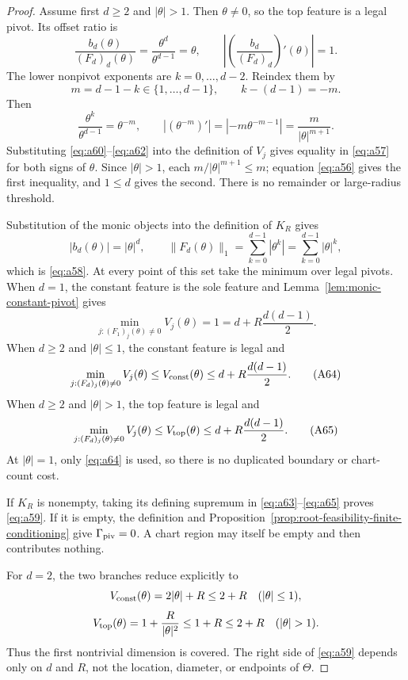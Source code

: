 \begin{proof}
Assume first $d\geq2$ and $|\theta|>1$.  Then $\theta\neq0$, so the top
feature is a legal pivot.  Its offset ratio is
\[
\frac{b_d(\theta)}{(F_d)_d(\theta)}
=\frac{\theta^d}{\theta^{d-1}}=\theta,
\qquad
\left|\left(\frac{b_d}{(F_d)_d}\right)'(\theta)\right|=1.
\tag{A60}\label{eq:a60}
\]
The lower nonpivot exponents are $k=0,\ldots,d-2$.  Reindex them by
\[
m=d-1-k\in\{1,\ldots,d-1\},
\qquad k-(d-1)=-m.
\tag{A61}\label{eq:a61}
\]
Then
\[
\frac{\theta^k}{\theta^{d-1}}=\theta^{-m},
\qquad
| (\theta^{-m})' |
=|-m\theta^{-m-1}|
=\frac{m}{|\theta|^{m+1}}.
\tag{A62}\label{eq:a62}
\]
Substituting \eqref{eq:a60}--\eqref{eq:a62} into the definition of $V_j$
gives equality in \eqref{eq:a57} for both signs of $\theta$.  Since
$|\theta|>1$, each $m/|\theta|^{m+1}\leq m$; equation \eqref{eq:a56}
gives the first inequality, and $1\leq d$ gives the second.  There is no
remainder or large-radius threshold.

Substitution of the monic objects into the definition of $K_R$ gives
\[
|b_d(\theta)|=|\theta|^d,
\qquad
\|F_d(\theta)\|_1
=\sum_{k=0}^{d-1}|\theta^k|
=\sum_{k=0}^{d-1}|\theta|^k,
\]
which is \eqref{eq:a58}.  At every point of this set take the minimum over
legal pivots.  When $d=1$, the constant feature is the sole feature and
Lemma~\ref{lem:monic-constant-pivot} gives
\[
\min_{j:(F_1)_j(\theta)\neq0}V_j(\theta)
=1=d+R\frac{d(d-1)}2.
\tag{A63}\label{eq:a63}
\]
When $d\geq2$ and $|\theta|\leq1$, the constant feature is legal and
\[
\min_{j:(F_d)_j(\theta)\neq0}V_j(\theta)
\leq V_{\rm const}(\theta)
\leq d+R\frac{d(d-1)}2.
\tag{A64}\label{eq:a64}
\]
When $d\geq2$ and $|\theta|>1$, the top feature is legal and
\[
\min_{j:(F_d)_j(\theta)\neq0}V_j(\theta)
\leq V_{\rm top}(\theta)
\leq d+R\frac{d(d-1)}2.
\tag{A65}\label{eq:a65}
\]
At $|\theta|=1$, only \eqref{eq:a64} is used, so there is no duplicated
boundary or chart-count cost.

If $K_R$ is nonempty, taking its defining supremum in
\eqref{eq:a63}--\eqref{eq:a65} proves \eqref{eq:a59}.  If it is empty,
the definition and Proposition~\ref{prop:root-feasibility-finite-conditioning}
give $\Gamma_{\rm piv}=0$.  A chart region may itself be empty and then
contributes nothing.

For $d=2$, the two branches reduce explicitly to
\[
V_{\rm const}(\theta)=2|\theta|+R\leq2+R
\quad(|\theta|\leq1),
\]
\[
V_{\rm top}(\theta)=1+\frac R{|\theta|^2}
\leq1+R\leq2+R
\quad(|\theta|>1).
\]
Thus the first nontrivial dimension is covered.  The right side of
\eqref{eq:a59} depends only on $d$ and $R$, not the location, diameter, or
endpoints of $\Theta$.
\end{proof}

